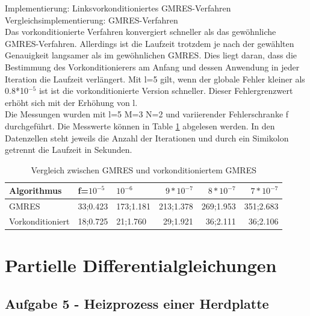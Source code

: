 \documentclass{report}
\begin{document}
Implementierung: Linksvorkonditioniertes GMRES-Verfahren\\
Vergleichsimplementierung: GMRES-Verfahren\\
Das vorkonditionierte Verfahren konvergiert schneller als das gewöhnliche GMRES-Verfahren. Allerdings ist die Laufzeit trotzdem je nach der gewählten Genauigkeit langsamer als im gewöhnlichen GMRES. Dies liegt daran, dass die Bestimmung des Vorkonditionierers am Anfang und dessen Anwendung in jeder Iteration die Laufzeit verlängert. Mit l=5 gilt, wenn der globale Fehler kleiner als 0.8*10$^{-5}$ ist ist die vorkonditionierte Version schneller. Dieser Fehlergrenzwert erhöht sich mit der Erhöhung von l.\\
Die Messungen wurden mit l=5 M=3 N=2 und variierender Fehlerschranke f durchgeführt. Die Messwerte können in Table \ref{Table:2_4d} abgelesen werden. In den Datenzellen steht jeweils die Anzahl der Iterationen und durch ein Simikolon getrennt die Laufzeit in Sekunden.\\
\begin{table}
\begin{tabular}{|l|l|l|r|r|r|}
	\hline
	Algorithmus&f=$10^{-5}$ &$10^{-6}$&$9*10^{-7}$& $8*10^{-7}$& $7*10^{-7}$\\
	\hline
	GMRES & 33;0.423 & 173;1.181 & 213;1.378 & 269;1.953 & 351;2.683 \\
	Vorkonditioniert & 18;0.725 & 21;1.760 & 29;1.921 & 36;2.111 & 36;2.106 \\
	\hline
	
\end{tabular}
	\caption{Vergleich zwischen GMRES und vorkonditioniertem GMRES}
	\label{Table:2_4d}
\end{table}

\section{Partielle Differentialgleichungen}
\subsection{Aufgabe 5 - Heizprozess einer Herdplatte}
\end{document}
